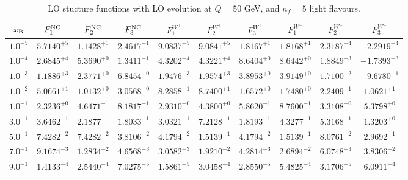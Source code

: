 \begin{table}[h]
\begin{adjustbox}{width=\textwidth}
\begin{tabular}{|c||c|c|c|c|c|c|c|c|c|}
\hline
$x_{\rm B}$ & $F_1^{\rm NC}$ & $F_2^{\rm NC}$ & $F_3^{\rm NC}$ & $F_1^{W^+}$ & $F_2^{W^+}$ & $F_3^{W^+}$ & $F_1^{W^-}$ & $F_2^{W^-}$ & $F_3^{W^-}$ \\
\hline
$ 1.0^{-5}$ & $ 5.7140^{+5}$ & $ 1.1428^{+1}$ & $ 2.4617^{+1}$ & $ 9.0837^{+5}$ & $ 9.0841^{+5}$ & $ 1.8167^{+1}$ & $ 1.8168^{+1}$ & $ 2.3187^{+4}$ & $-2.2919^{+4}$ \\
$ 1.0^{-4}$ & $ 2.6845^{+4}$ & $ 5.3690^{+0}$ & $ 1.3411^{+1}$ & $ 4.3202^{+4}$ & $ 4.3221^{+4}$ & $ 8.6404^{+0}$ & $ 8.6442^{+0}$ & $ 1.8849^{+3}$ & $-1.7393^{+3}$ \\
$ 1.0^{-3}$ & $ 1.1886^{+3}$ & $ 2.3771^{+0}$ & $ 6.8454^{+0}$ & $ 1.9476^{+3}$ & $ 1.9574^{+3}$ & $ 3.8953^{+0}$ & $ 3.9149^{+0}$ & $ 1.7100^{+2}$ & $-9.6780^{+1}$ \\
$ 1.0^{-2}$ & $ 5.0661^{+1}$ & $ 1.0132^{+0}$ & $ 3.0568^{+0}$ & $ 8.2858^{+1}$ & $ 8.7400^{+1}$ & $ 1.6572^{+0}$ & $ 1.7480^{+0}$ & $ 2.2409^{+1}$ & $ 1.0621^{+1}$ \\
$ 1.0^{-1}$ & $ 2.3236^{+0}$ & $ 4.6471^{-1}$ & $ 8.1817^{-1}$ & $ 2.9310^{+0}$ & $ 4.3800^{+0}$ & $ 5.8620^{-1}$ & $ 8.7600^{-1}$ & $ 3.3108^{+0}$ & $ 5.3798^{+0}$ \\
$ 3.0^{-1}$ & $ 3.6462^{-1}$ & $ 2.1877^{-1}$ & $ 1.8033^{-1}$ & $ 3.0321^{-1}$ & $ 7.2128^{-1}$ & $ 1.8193^{-1}$ & $ 4.3277^{-1}$ & $ 5.3168^{-1}$ & $ 1.3203^{+0}$ \\
$ 5.0^{-1}$ & $ 7.4282^{-2}$ & $ 7.4282^{-2}$ & $ 3.8106^{-2}$ & $ 4.1794^{-2}$ & $ 1.5139^{-1}$ & $ 4.1794^{-2}$ & $ 1.5139^{-1}$ & $ 8.0761^{-2}$ & $ 2.9692^{-1}$ \\
$ 7.0^{-1}$ & $ 9.1674^{-3}$ & $ 1.2834^{-2}$ & $ 4.6568^{-3}$ & $ 3.0582^{-3}$ & $ 1.9210^{-2}$ & $ 4.2814^{-3}$ & $ 2.6894^{-2}$ & $ 6.0748^{-3}$ & $ 3.8306^{-2}$ \\
$ 9.0^{-1}$ & $ 1.4133^{-4}$ & $ 2.5440^{-4}$ & $ 7.0275^{-5}$ & $ 1.5861^{-5}$ & $ 3.0458^{-4}$ & $ 2.8550^{-5}$ & $ 5.4825^{-4}$ & $ 3.1706^{-5}$ & $ 6.0911^{-4}$ \\
\hline
\end{tabular}
\end{adjustbox}\caption{LO stucture functions with LO evolution at $Q = 50$ GeV, and $n_f=5$ light flavours.}
\label{tab:N0LO-Q50}
\end{table}



